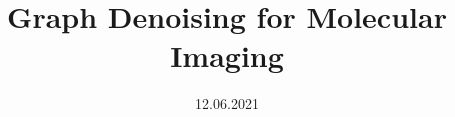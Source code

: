 \documentclass[a4paper, 10pt, oneside]{memoir}
\title				{Graph Denoising for Molecular Imaging}
\date				{12.06.2021}
\begin{document}

\thesisfront
\maketitle
\pagestyle{thesis}


\thesistoc
\thesismain

%



%
%
%
%
%

\thesisbib
\begin{appendices}
	 
\end{appendices}
\thesisback

\end{document}
